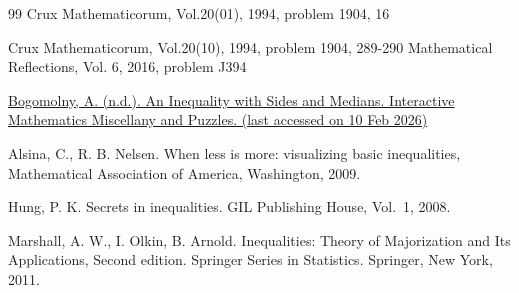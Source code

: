 \documentclass[a4paper,12pt]{article}
\begin{document}
 
\begin{thebibliography}{99} %
 Crux Mathematicorum, Vol.20(01), 1994, problem 1904, 16

 Crux Mathematicorum, Vol.20(10), 1994, problem 1904, 289-290
 Mathematical Reflections, Vol. 6, 2016, problem J394

 \href{https://www.cut-the-knot.org/triangle/InequalityWithSidesAndMedians.shtml}{Bogomolny, A. (n.d.). An Inequality with Sides and Medians. Interactive Mathematics Miscellany and Puzzles. (last accessed on 10 Feb 2026)} 

 Alsina, C.,  R. B. Nelsen. When less is more: visualizing basic inequalities, Mathematical Association of America, Washington, 2009.

 Hung, P. K. Secrets in inequalities. GIL Publishing House, Vol.~1, 2008.


 Marshall, A. W., I. Olkin, B. Arnold. Inequalities: Theory of Majorization and Its Applications, Second edition. Springer Series in Statistics. Springer, New York, 2011. 

\end{thebibliography}
\end{document}
